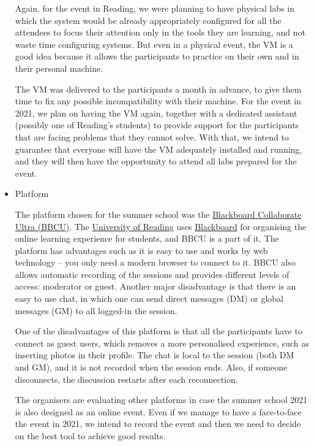 \begin{itemize}
Again, for the event in Reading, we were planning to have physical labs in which the system would be already appropriately configured for all the attendees to focus their attention only in the tools they are learning, and not waste time configuring systems. But even in a physical event, the VM is a good idea because it allows the participants to practice on their own and in their personal machine.

The VM was delivered to the participants a month in advance, to give them time to fix any possible incompatibility with their machine. For the event in 2021, we plan on having the VM again, together with a dedicated assistant (possibly one of Reading's students) to provide support for the participants that are facing problems that they cannot solve. With that, we intend to guarantee that everyone will have the VM adequately installed and running, and they will then have the opportunity to attend all labs prepared for the event.

\item Platform

The platform chosen for the summer school was the \href{https://www.blackboard.com/teaching-learning/collaboration-web-conferencing/blackboard-collaborate}{Blackboard Collaborate Ultra (BBCU)}. The \href{http://www.reading.ac.uk/}{University of Reading} uses \href{https://www.blackboard.com/en-uk}{Blackboard} for organising the online learning experience for students, and BBCU is a part of it. The platform has advantages such as it is easy to use and works by web technology -- you only need a modern browser to connect to it. BBCU also allows automatic recording of the sessions and provides different levels of access: moderator or guest. Another major disadvantage is that there is an easy to use chat, in which one can send direct messages (DM) or global messages (GM) to all logged-in the session.

One of the disadvantages of this platform is that all the participants have to connect as guest users, which removes a more personalised experience, such as inserting photos in their profile. The chat is local to the session (both DM and GM), and it is not recorded when the session ends. Also, if someone disconnects, the discussion restarts after each reconnection.

The organisers are evaluating other platforms in case the summer school 2021 is also designed as an online event. Even if we manage to have a face-to-face the event in 2021, we intend to record the event and then we need to decide on the best tool to achieve good results.


\end{itemize}
